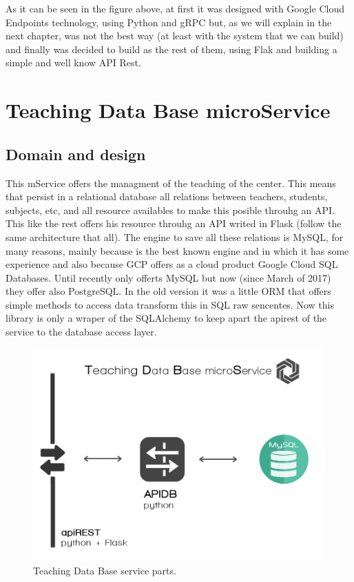 \noindent As it can be seen in the figure above, at first it was designed with Google Cloud
Endpoints technology, using Python and gRPC but, as we will explain in the next
chapter, was not the best way (at least with the system that we can build) and
finally was decided to build as the rest of them, using Flak and building a
simple and well know API Rest.


\section{Teaching Data Base microService}

\subsection{Domain and design}

This mService offers the managment of the teaching of the center.
This means that persist in a relational database all relations between
teachers, students, subjects, etc, and all resource availables to
make this posible throuhg an API.
\intro
This like the rest offers his resource throuhg an API writed in Flask
(follow the same architecture that all).
\intro
The engine to save all these relations is MySQL, for many reasons,
mainly because is the best known engine and in which it has some experience
and also because GCP offers as a cloud product Google Cloud SQL Databases.
Until recently only offerts MySQL but now (since March of 2017) they
offer also PostgreSQL.
\intro
In the old version it was a little ORM that offers simple methods
to access data transform this in SQL raw sencentes. Now this library
is only a wraper of the SQLAlchemy to keep apart the apirest of the
service to the database access layer.

\begin{figure}[H]
  \includegraphics[scale=0.35]{img/graphics/tdbms.png}
  \centering
  \caption{Teaching Data Base service parts.}
\end{figure}


